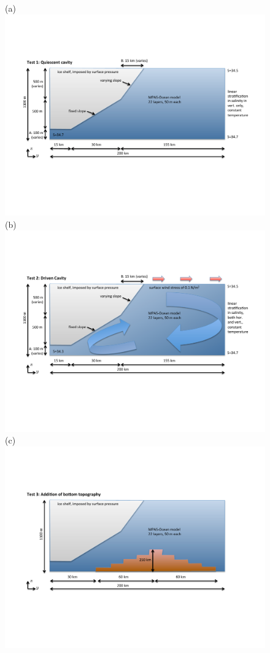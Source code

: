 \documentclass[11pt]{report}
\begin{document}
\begin{figure}[tbh]
\center
(a)\includegraphics[width=5.75in]{f/sub-ice_shelf_test1.pdf}\\
\vspace{.2in}
(b)\includegraphics[width=5.75in]{f/sub-ice_shelf_test2.pdf}\\
\vspace{.2in}
(c)\includegraphics[width=5.75in]{f/sub-ice_shelf_test3.pdf}\\

\end{figure}
\end{document}
